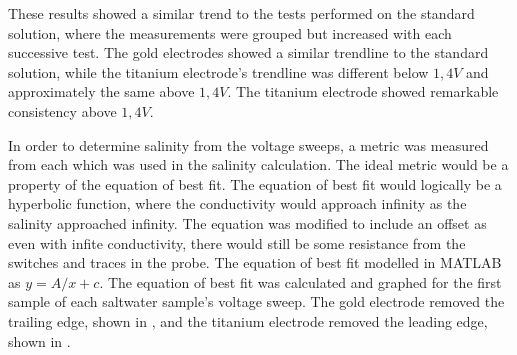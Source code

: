 These results showed a similar trend to the tests performed on the standard solution, where the measurements were grouped but increased with each successive test.
The gold electrodes showed a similar trendline to the standard solution, while the titanium electrode's trendline was different below $1,4V$ and approximately the same above $1,4V$.
The titanium electrode showed remarkable consistency above $1,4V$.

In order to determine salinity from the voltage sweeps, a metric was measured from each which was used in the salinity calculation.
The ideal metric would be a property of the equation of best fit.
The equation of best fit would logically be a hyperbolic function, where the conductivity would approach infinity as the salinity approached infinity.
The equation was modified to include an offset as even with infite conductivity, there would still be some resistance from the switches and traces in the probe.
The equation of best fit modelled in MATLAB as $y = A/x + c$.
The equation of best fit was calculated and graphed for the first sample of each saltwater sample's voltage sweep.
The gold electrode removed the trailing edge, shown in , and the titanium electrode removed the leading edge, shown in .

